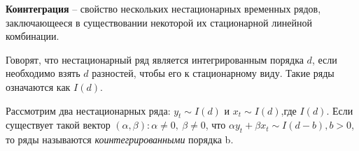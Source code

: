 \documentclass[a0,final]{a0poster}
\begin{document}
\begin{multicols}{4}
\begin{tcolorbox}[colback=green!5!white,colframe=green!75!black]
\textbf{Коинтеграция} -- свойство нескольких нестационарных временных рядов, заключающееся в существовании некоторой их стационарной линейной комбинации.
\end{tcolorbox}
Говорят, что нестационарный ряд является интегрированным порядка $d$, если необходимо взять $d$ разностей, чтобы его к стационарному виду. Такие ряды означаются как $I(d)$. \\
\begin{tcolorbox}[colback=blue!5!white,colframe=blue!75!black]
Рассмотрим два нестационарных ряда: $y_t\sim I(d)$ и $x_t\sim I(d)$,где $I(d)$. Если существует такой вектор $(\alpha,\beta):\alpha\neq0,\:\beta\neq0$, что $\alpha y_t+\beta x_t\sim I(d-b), b>0$, то ряды называются \textit{коинтегрированными} порядка b.
\end{tcolorbox}

\end{multicols}
\end{document}
